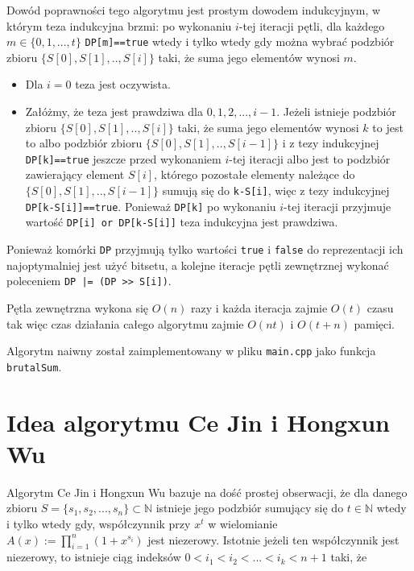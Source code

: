 \documentclass{article}
\begin{document}
Dowód poprawności tego algorytmu jest prostym dowodem indukcyjnym, w którym teza indukcyjna
brzmi: po wykonaniu $i$-tej iteracji pętli, dla każdego $m \in \{0,1,...,t\}$
\texttt{DP[m]==true}
wtedy i tylko wtedy
gdy można wybrać podzbiór zbioru
$\{S\left[0\right],S\left[1\right],..,S\left[i\right]\}$
taki, że suma jego elementów wynosi 
$m$. 
\begin{itemize}
    \item Dla $i = 0$ teza jest oczywista.
    \item Załóżmy, że teza jest prawdziwa dla $0,1,2,...,i-1$. Jeżeli istnieje podzbiór
    zbioru $\{S \left[ 0 \right],S\left[ 1 \right],..,S\left[ i \right]\}$ taki, że suma jego elementów wynosi $k$ to jest to 
    albo podzbiór zbioru $\{{S\left[0\right],S\left[1\right],..,S\left[i-1\right]\}}$ i z tezy indukcyjnej \texttt{DP[k]==true}
    jeszcze przed wykonaniem $i$-tej iteracji albo jest to podzbiór zawierający element
    $S\left[i \right]$, którego pozostałe elementy należące do 
    $\{S \left[ 0 \right] ,S \left[ 1 \right],..,S \left[ i-1 \right] \}$ sumują się 
    do \texttt{k-S[i]}, więc z tezy indukcyjnej \texttt{DP[k-S[i]]==true}. Ponieważ \texttt{DP[k]} po wykonaniu $i$-tej iteracji
    przyjmuje wartość \texttt{DP[i] or DP[k-S[i]]} teza indukcyjna jest prawdziwa.

\end{itemize}
Ponieważ komórki \texttt{DP} przyjmują tylko wartości \texttt{true} i \texttt{false} do reprezentacji ich najoptymalniej jest
użyć bitsetu, a kolejne iteracje pętli zewnętrznej wykonać poleceniem \texttt{DP |= (DP >> S[i])}.

Pętla zewnętrzna wykona się $O(n)$ razy i każda iteracja zajmie $O(t)$ czasu tak więc
czas działania całego algorytmu zajmie $O(nt)$ i $O(t+n)$ pamięci.

Algorytm naiwny został zaimplementowany w pliku \texttt{main.cpp} jako funkcja \texttt{brutalSum}.

\section{Idea algorytmu Ce Jin i Hongxun Wu}


Algorytm Ce Jin i Hongxun Wu bazuje na dość prostej obserwacji, że dla danego zbioru
$S=\{s_1,s_2,...,s_n\} \subset \mathbb{N}$ istnieje jego podzbiór sumujący się do $t \in \mathbb{N}$ wtedy 
i tylko wtedy gdy, współczynnik przy $x^t$ w  wielomianie $A(x) :=\prod_{i = 1}^{n}(1+x^{s_i})$ jest 
niezerowy. Istotnie jeżeli ten współczynnik jest niezerowy, to istnieje ciąg indeksów $0<i_1<i_2<...<i_k<n+1$ taki, że 
\end{document}
